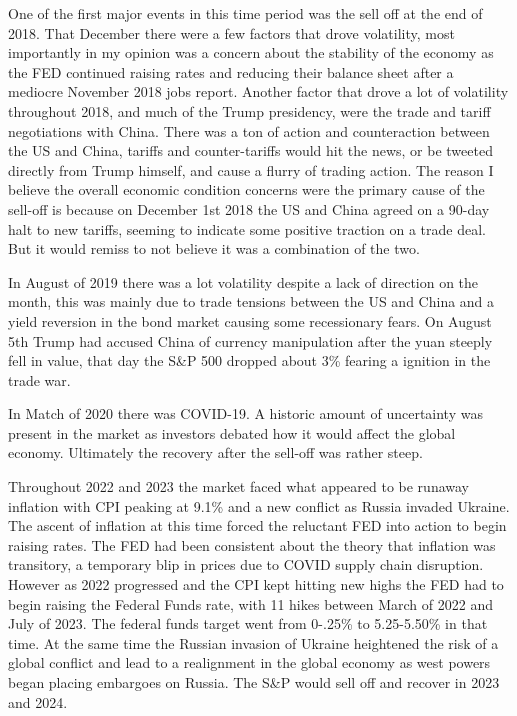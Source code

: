 \documentclass[
  letterpaper,
  DIV=11,
  numbers=noendperiod]{scrartcl}
\begin{document}
One of the first major events in this time period was the sell off at
the end of 2018. That December there were a few factors that drove
volatility, most importantly in my opinion was a concern about the
stability of the economy as the FED continued raising rates and reducing
their balance sheet after a mediocre November 2018 jobs report. Another
factor that drove a lot of volatility throughout 2018, and much of the
Trump presidency, were the trade and tariff negotiations with China.
There was a ton of action and counteraction between the US and China,
tariffs and counter-tariffs would hit the news, or be tweeted directly
from Trump himself, and cause a flurry of trading action. The reason I
believe the overall economic condition concerns were the primary cause
of the sell-off is because on December 1st 2018 the US and China agreed
on a 90-day halt to new tariffs, seeming to indicate some positive
traction on a trade deal. But it would remiss to not believe it was a
combination of the two.

In August of 2019 there was a lot volatility despite a lack of direction
on the month, this was mainly due to trade tensions between the US and
China and a yield reversion in the bond market causing some recessionary
fears. On August 5th Trump had accused China of currency manipulation
after the yuan steeply fell in value, that day the S\&P 500 dropped
about 3\% fearing a ignition in the trade war.

In Match of 2020 there was COVID-19. A historic amount of uncertainty
was present in the market as investors debated how it would affect the
global economy. Ultimately the recovery after the sell-off was rather
steep.

Throughout 2022 and 2023 the market faced what appeared to be runaway
inflation with CPI peaking at 9.1\% and a new conflict as Russia invaded
Ukraine. The ascent of inflation at this time forced the reluctant FED
into action to begin raising rates. The FED had been consistent about
the theory that inflation was transitory, a temporary blip in prices due
to COVID supply chain disruption. However as 2022 progressed and the CPI
kept hitting new highs the FED had to begin raising the Federal Funds
rate, with 11 hikes between March of 2022 and July of 2023. The federal
funds target went from 0-.25\% to 5.25-5.50\% in that time. At the same
time the Russian invasion of Ukraine heightened the risk of a global
conflict and lead to a realignment in the global economy as west powers
began placing embargoes on Russia. The S\&P would sell off and recover
in 2023 and 2024.
\end{document}
